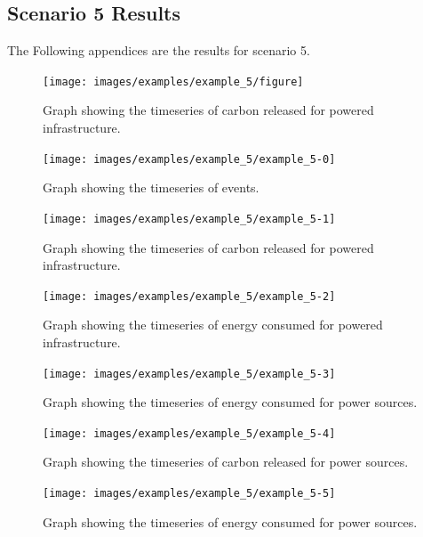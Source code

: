 \documentclass{l4proj}
\begin{document}
\begin{appendices}
\clearpage
\section{Scenario 5 Results}\label{apen:subsec:scen5}
The Following appendices are the results for scenario 5.
\clearpage
\begin{figure}[htbp]
    \centering
    \texttt{[image: images/examples/example\_5/figure]}
    ~
    \caption{Graph showing the timeseries of carbon released for powered infrastructure.}
    \label{fig:example2-0}
\end{figure}
\clearpage
\begin{figure}[htbp]
    \centering
    \texttt{[image: images/examples/example\_5/example\_5-0]}
    ~
    \caption{Graph showing the timeseries of events.}
    \label{fig:example5-0}
\end{figure}
\clearpage
\begin{figure}[htbp]
    \centering
    \texttt{[image: images/examples/example\_5/example\_5-1]}
    ~
    \caption{Graph showing the timeseries of carbon released for powered infrastructure.}
    \label{fig:example5-1}
\end{figure}
\clearpage
\begin{figure}[htbp]
    \centering
    \texttt{[image: images/examples/example\_5/example\_5-2]}
    ~
    \caption{Graph showing the timeseries of energy consumed for powered infrastructure.}
    \label{fig:example5-2}
\end{figure}
\clearpage
\begin{figure}[htbp]
    \centering
    \texttt{[image: images/examples/example\_5/example\_5-3]}
    ~
    \caption{Graph showing the timeseries of energy consumed for power sources.}
    \label{fig:example5-3}
\end{figure}
\clearpage
\begin{figure}[htbp]
    \centering
    \texttt{[image: images/examples/example\_5/example\_5-4]}
    ~
    \caption{Graph showing the timeseries of carbon released for power sources.}
    \label{fig:example5-4}
\end{figure}
\clearpage
\begin{figure}[htbp]
    \centering
    \texttt{[image: images/examples/example\_5/example\_5-5]}
    ~
    \caption{Graph showing the timeseries of energy consumed for power sources.}
    \label{fig:example5-5}
\end{figure}


\end{appendices}
\end{document}
